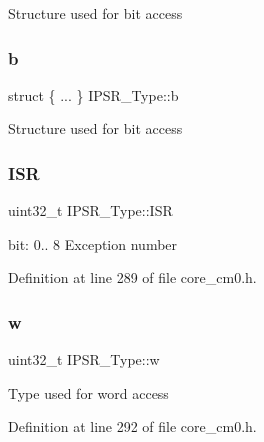 Structure used for bit access \mbox{\label{union_i_p_s_r___type_a23c14601470ff92495d34a6503d6f74d}} 
\subsubsection{\texorpdfstring{b}{b}\hspace{0.1cm}{\footnotesize\ttfamily [7/7]}}
{\footnotesize\ttfamily struct \{ ... \}   I\+P\+S\+R\+\_\+\+Type\+::b}

Structure used for bit access \mbox{\label{union_i_p_s_r___type_ab46e5f1b2f4d17cfb9aca4fffcbb2fa5}} 
\subsubsection{\texorpdfstring{I\+SR}{ISR}}
{\footnotesize\ttfamily uint32\+\_\+t I\+P\+S\+R\+\_\+\+Type\+::\+I\+SR}

bit\+: 0.. 8 Exception number 

Definition at line 289 of file core\+\_\+cm0.\+h.

\mbox{\label{union_i_p_s_r___type_a4adca999d3a0bc1ae682d73ea7cfa879}} 
\subsubsection{\texorpdfstring{w}{w}}
{\footnotesize\ttfamily uint32\+\_\+t I\+P\+S\+R\+\_\+\+Type\+::w}

Type used for word access 

Definition at line 292 of file core\+\_\+cm0.\+h.



